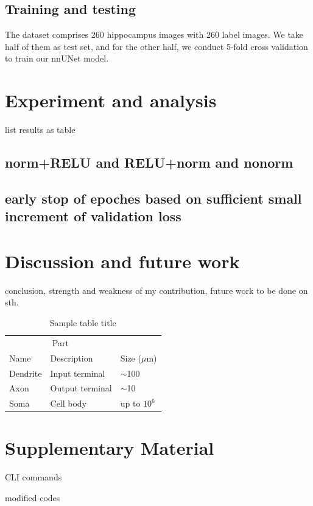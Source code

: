 \documentclass{article}
\begin{document}
\subsection{Training and testing}

The dataset comprises 260 hippocampus images with 260 label images. We take half of them as test set, and for the other half, we conduct 5-fold cross validation to train our nnUNet model.

\section{Experiment and analysis}

list results as table

\subsection{norm+RELU and RELU+norm and nonorm}



\subsection{early stop of epoches based on sufficient small increment of validation loss}



\section{Discussion and future work}


conclusion, strength and weakness of my contribution, future work to be done on sth.






\begin{table}
  \caption{Sample table title}
  \label{sample-table}
  \centering
  \begin{tabular}{lll}
    \toprule
    \multicolumn{2}{c}{Part}                   \\
    \cmidrule(r){1-2}
    Name     & Description     & Size ($\mu$m) \\
    \midrule
    Dendrite & Input terminal  & $\sim$100     \\
    Axon     & Output terminal & $\sim$10      \\
    Soma     & Cell body       & up to $10^6$  \\
    \bottomrule
  \end{tabular}
\end{table}


\section*{Supplementary Material}

CLI commands

modified codes



\end{document}
